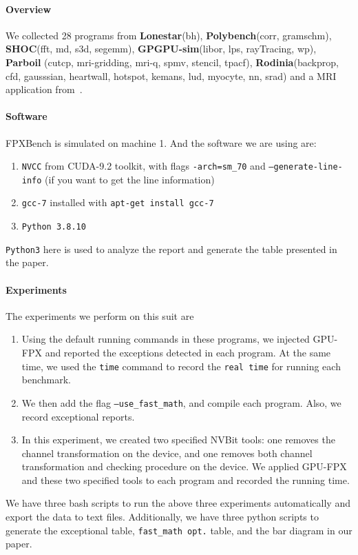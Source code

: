 \documentclass{article}
\begin{document}
	\paragraph{Overview}
	We collected 28 programs from \textbf{Lonestar}(bh), \textbf{Polybench}(corr, gramschm), \textbf{SHOC}(fft, md, s3d, segemm), \textbf{GPGPU-sim}(libor, lps, rayTracing, wp), \textbf{Parboil} (cutcp, mri-gridding, mri-q, spmv, stencil, tpacf),  \textbf{Rodinia}(backprop, cfd, gausssian, heartwall, hotspot, kemans, lud, myocyte, nn, srad) and a MRI application from~\cite{LI2015998}. 
	\paragraph{Software} FPXBench is simulated on machine 1. 
	And the software we are using are:
	\begin{enumerate}
		\item {\tt NVCC} from CUDA-9.2 toolkit, with flags {\tt -arch=sm\_70} and {\tt --generate-line-info} (if you want to get the line information)
		\item {\tt gcc-7} installed with {\tt apt-get install gcc-7}
		\item  {\tt Python 3.8.10}
	\end{enumerate}
	{\tt Python3} here is used to analyze the report and generate the table presented in the paper. 
	
	\paragraph{Experiments}The experiments we perform on this suit are
	\begin{enumerate}
		\item Using the default running commands in these programs, we injected GPU-FPX and reported the exceptions detected in each program. At the same time, we used the {\tt time} command to record the {\tt real time} for running each benchmark.   
		\item We then add the flag {\tt --use\_fast\_math}, and compile each program. Also, we record exceptional reports. 
		\item In this experiment, we created two specified NVBit tools: one removes the channel transformation on the device, and one removes both channel transformation and checking procedure on the device. We applied GPU-FPX and these two specified tools to each program and recorded the running time. 
	\end{enumerate}
	We have three bash scripts to run the above three experiments automatically and export the data to text files. Additionally, we have three python scripts to generate the exceptional table, {\tt fast\_math opt.} table, and the bar diagram in our paper. 
	
\end{document}
